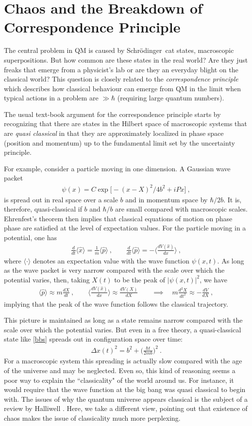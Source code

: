 \documentclass[12pt]{article}
\theoremstyle{plain}
\theoremstyle{definition}
\theoremstyle{remark}
\def\SCH{Schr\"odinger\ }
\newcommand{\EQ}[1]{\begin{equation}\begin{split} #1
\end{split}\end{equation}}
\begin{document}
\section{Chaos and the Breakdown of Correspondence Principle}\label{s3}

The central problem in QM is caused by \SCH cat states, macroscopic superpositions. But how common are these states in the real world? Are they just freaks that emerge from a physicist's lab or are they an everyday blight on the classical world? This question is closely related to the 
{\it correspondence principle\/} which describes how classical behaviour can emerge from QM in the limit when typical actions in a problem are $\gg\hbar$ (requiring large quantum numbers).

The usual text-book argument for the correspondence principle starts by recognizing that there are states in the Hilbert space of macroscopic systems that are {\it quasi classical\/} in that they are approximately localized in phase space (position and momentum) up to the fundamental limit set by the uncertainty principle.

For example, consider a particle moving in one dimension. A Gaussian wave packet 
\EQ{
\psi(x)=C\exp\big[-(x-X)^2/4b^2+iPx\big]\ ,
\label{bbs}
}
is spread out in real space over a scale $b$ and in momentum space by $\hbar/2b$. It is, therefore, quasi-classical if $b$ and $\hbar/b$ are small compared with macroscopic scales.
Ehrenfest's theorem then implies that classical equations of motion on phase phase are satisfied at the level of expectation values. For the particle moving in a potential, one has
\EQ{
\frac d{dt}\langle\hat x\rangle=\frac1m\langle\hat p\rangle\ ,\qquad\frac{d}{dt}\langle\hat p\rangle = -\big\langle \frac{dV(\hat x)}{dx}\big\rangle\ ,
}
where $\langle\cdot\rangle$ denotes an expectation value with the wave function $\psi(x,t)$.
As long as the wave packet is very narrow compared with the scale over which the potential varies, then, taking $X(t)$ to be the peak of $|\psi(x,t)|^2$, we have
\EQ{
\langle\hat p\rangle\approx m\frac{dX}{dt}\ ,\qquad\big\langle \frac{dV(\hat x)}{dx}\big\rangle\approx\frac{dV(X)}{dX}\qquad\implies\quad m\frac{d^2X}{dt^2}\approx-\frac{dV}{dX}\ ,
}
implying that the peak of the wave function follows the classical trajectory.

This picture is maintained as long as a state remains narrow compared with the scale over which the potential varies. But even in a free theory,  a quasi-classical state like \eqref{bbs} spreads out in configuration space over time:
\EQ{
\Delta x(t)^2=b^2+\Big(\frac{\hbar t}{2mb}\Big)^2\ .
\label{ytt}
}
For a macroscopic system this spreading is actually slow compared with the age of the universe and may be neglected. Even so, this kind of reasoning seems a poor way to explain the ``classicality" of the world around us. For instance, it would require that the wave function at the big bang was quasi classical to begin with. The issues of why the quantum universe appears classical is the subject of a review by Halliwell \cite{Hal}. Here, we take a different view, pointing out that existence of chaos makes the issue of classicality much more perplexing.
\end{document}
